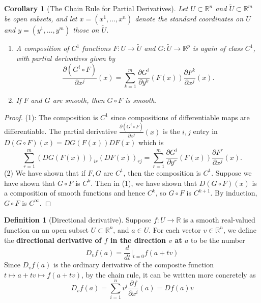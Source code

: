 \documentclass[reqno]{amsart}
\theoremstyle{plain}%
\newtheorem{corollary}[theorem]{Corollary}
\theoremstyle{definition}
\newtheorem{definition}[theorem]{Definition}
\theoremstyle{remark}
\begin{document}
        \begin{corollary}[The Chain Rule for Partial
        Derivatives]\label{chain-rule-partial-derivative}
        Let $U \subset \mathbb{R}^{n}$ and $\tilde{U}
        \subset \mathbb{R}^{m}$ be open subsets, and let
        $x = \left( x^{1},\ldots, x^{n} \right) $ denote the standard coordinates
        on $U$ and $y = \left( y^{1},\ldots, y^{m} \right) $ those on $\tilde{U}$.
        \begin{enumerate}
            \item A composition of $C^{1}$ functions $F  \colon U \to \tilde{U}$ 
                and
                $G  \colon \tilde{U} \to \mathbb{R}^{p}$ is again of class $C^{1}$,
                with partial derivatives given by
                \[
                \frac{\partial \left( G^{i} \circ F \right) }{\partial x^{j}}(x)
                = \sum_{k=1}^{m} \frac{\partial G^{i}}{\partial y^{k}}\left( F(x) \right) 
                \frac{\partial F^{k}}{\partial x^{j}}(x).
                \] 
            \item If $F$ and $G$ are smooth, then $G \circ F$ is smooth.
        \end{enumerate}
        \end{corollary}


        \begin{proof}
        (1): The composition is $C^{1}$ since compositions of differentiable maps
        are differentiable. The partial derivative
        $\frac{\partial \left( G^{i} \circ F \right) }{\partial x^{j}}(x)$ is the
        $i,j$ entry in $D\left( G \circ F \right)(x)
        = DG\left( F(x) \right) DF(x) $ which is
        \[
        \sum_{r=1}^{m} \left( DG \left( F(x) \right)  \right)_{i r}
        \left( DF(x) \right)_{rj}
        = \sum_{r=1}^{m} \frac{\partial G^{i}}{\partial y^{r}} \left( F(x) \right) 
        \frac{\partial F^{r}}{\partial x^{j}}(x).
        \] 
        (2) We have shown that if $F,G$ are $C^{1}$, then the composition is
        $C^{1}$. Suppose we have shown that  $G \circ F$ is $C^{k}$. Then
        in (1), we have shown that $D \left( G \circ F \right) (x)$ is
        a composition of smooth functions and hence $C^{k}$, so
        $G \circ F$ is $C^{k+1}$. By induction, $G \circ F$ is $C^{\infty}$.
        \end{proof}

        \begin{definition}[Directional derivative]
        Suppose $f  \colon U \to \mathbb{R}$ is a smooth real-valued function on an
        open subset $U \subset \mathbb{R}^{n}$, and $a \in U$. For each vector
        $v \in \mathbb{R}^{n}$, we define the \textbf{directional derivative of $f$ 
        in the direction $v$ at $a$} to be the number
        \[
        D_v f(a) = \frac{d}{dt}\Big|_{t=0} f\left( a+tv \right) 
        \] 
        Since $D_v f(a)$ is the ordinary derivative of the composite function
        $t \mapsto a+tv \mapsto f\left( a+tv \right) $, by the chain rule, it can
        be written more concretely as
        \[
        D_v f(a) = \sum_{i=1}^{n} v^{i} \frac{\partial f}{\partial x^{i}}(a)
        = Df(a) v
        \] 
        \end{definition}
\end{document}

